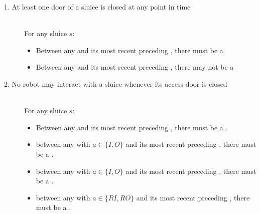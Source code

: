 
\begin{description}
 \item[1. At least one door of a sluice is closed at any point in time] \hfill \\
 For any sluice $s$:
 \begin{itemize}
  \item Between any  and its most recent preceding , there must be a 
  \item Between any  and its most recent preceding , there may not be a 
 \end{itemize}

 \item[2. No robot may interact with a sluice whenever its access door is closed] \hfill \\
For any sluice $s$:

\begin{itemize}
	\item Between any  and its most recent preceding , there must be a .
	\item between any  with $a \in \{ I, O \}$ and its most recent preceding , there must be a .
	\item between any  with $a \in \{ I, O \}$ and its most recent preceding , there must be a .
	\item between any  with $a \in \{ RI, RO \}$ and its most recent preceding , there must be a .
\end{itemize}
 

\end{description}
